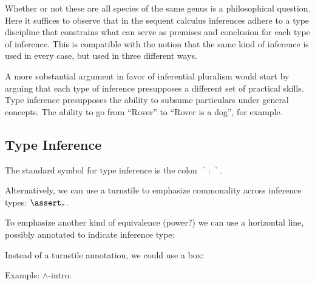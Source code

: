 \documentclass{article}
\begin{document}
Whether or not these are all species of the same genus is a
philosophical question. Here it suffices to observe that in the
sequent calculus inferences adhere to a type discipline that
constrains what can serve as premises and conclusion for each type of
inference. This is compatible with the notion that the same kind of
inference is used in every case, but used in three different ways.

A more substantial argument in favor of inferential pluralism would
start by arguing that each type of inference presupposes a different
set of practical skills. Type inference presupposes the ability to
subsume particulars under general concepts. The ability to go from
``Rover'' to ``Rover is a dog'', for example.

\subsection{Type Inference}

The standard symbol for type inference is the colon \(\ulcorner :\urcorner\).

Alternatively, we can use a turnstile to emphasize commonality across inference types: \(\linfer_{\tau}\).

To emphasize another kind of equivalence (power?) we can use a horizontal line, possibly annotated to indicate inference type:

Instead of a turnstile annotation, we could use a box:

Example: \(\land\text{-intro}\):



\end{document}
